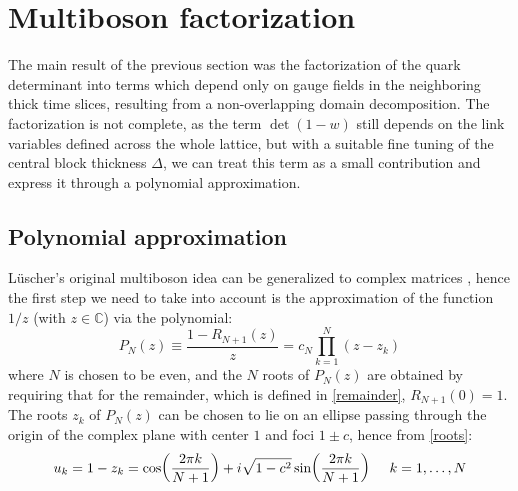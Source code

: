  \section{Multiboson factorization}
 The main result of the previous section was the factorization of the quark determinant into terms which depend only on gauge fields in the neighboring thick time slices, resulting from a non-overlapping domain decomposition. The factorization is not complete, as the term $\det(1-w)$ still depends on the link variables defined across the whole lattice, but with a suitable fine tuning of the central block thickness $\Delta$, we can treat this term as a small contribution and express it through a polynomial approximation.
 \subsection{Polynomial approximation}
 Lüscher's original multiboson idea \cite{L_scher_1994} can be generalized to complex matrices \cite{Bori_i_1995, Bori_i_1996, Jegerlehner_1996}, hence the first step we need to take into account is the approximation of the function $1/z$ (with $z \in \mathbb{C}$) via the polynomial:
 \begin{equation}\label{pol}
    P_N (z) \equiv \frac{1 - R_{N+1}(z)}{z} = c_N \prod_{k = 1}^N (z - z_k)
 \end{equation}
 where $N$ is chosen to be even, and the $N$ roots of $P_N(z)$ are obtained by requiring that for the remainder, which is defined in \eqref{remainder}, $R_{N+1}(0) = 1$. The roots $z_k$ of $P_N(z)$ can be chosen to lie on an ellipse passing through the origin of the complex plane with center $1$ and foci $1 \pm c$, hence from \eqref{roots}:
 \begin{equation}
     u_k = 1 - z_k = \cos(\frac{2\pi k}{N+1}) + i \sqrt{1 - c^2} \sin(\frac{2 \pi k}{N + 1}) \hspace{5mm} k = 1, \dots, N
 \end{equation}

